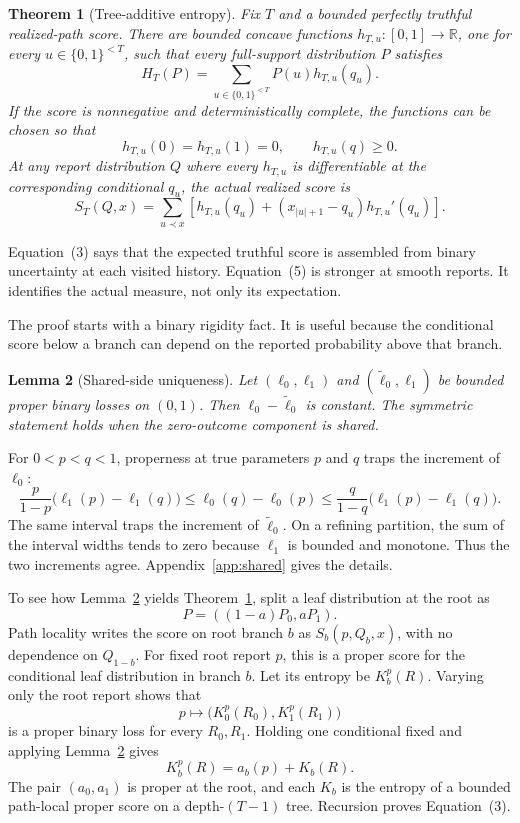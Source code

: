 \documentclass{article}
\newtheorem{theorem}{Theorem}
\newtheorem{lemma}[theorem]{Lemma}
\theoremstyle{definition}
\theoremstyle{remark}
\newcommand{\1}{\mathbf 1}
\begin{document}
\begin{theorem}[Tree-additive entropy]\label{thm:factorization}
Fix \(T\) and a bounded perfectly truthful realized-path score. There are bounded concave functions \(h_{T,u}:[0,1]\to\mathbb R\), one for every \(u\in\{0,1\}^{<T}\), such that every full-support distribution \(P\) satisfies \[ H_T(P)=\sum_{u\in\{0,1\}^{<T}}P(u)h_{T,u}(q_u). \tag{3} \] If the score is nonnegative and deterministically complete, the functions can be chosen so that \[ h_{T,u}(0)=h_{T,u}(1)=0,\qquad h_{T,u}(q)\ge0. \tag{4} \] At any report distribution \(Q\) where every \(h_{T,u}\) is differentiable at the corresponding conditional \(q_u\), the actual realized score is \[ S_T(Q,x)=\sum_{u\prec x}\left[h_{T,u}(q_u)+(x_{|u|+1}-q_u)h_{T,u}'(q_u)\right]. \tag{5} \]
\end{theorem}

Equation~(3) says that the expected truthful score is assembled from binary uncertainty at each visited history. Equation~(5) is stronger at smooth reports. It identifies the actual measure, not only its expectation.

The proof starts with a binary rigidity fact. It is useful because the conditional score below a branch can depend on the reported probability above that branch.

\begin{lemma}[Shared-side uniqueness]\label{lem:shared}
Let \((\ell_0,\ell_1)\) and \((\widetilde\ell_0,\ell_1)\) be bounded proper binary losses on \((0,1)\). Then \(\ell_0-\widetilde\ell_0\) is constant. The symmetric statement holds when the zero-outcome component is shared.
\end{lemma}

For \(0<p<q<1\), properness at true parameters \(p\) and \(q\) traps the increment of \(\ell_0\): \[ \frac{p}{1-p}\bigl(\ell_1(p)-\ell_1(q)\bigr) \le \ell_0(q)-\ell_0(p) \le \frac{q}{1-q}\bigl(\ell_1(p)-\ell_1(q)\bigr). \tag{6} \] The same interval traps the increment of \(\widetilde\ell_0\). On a refining partition, the sum of the interval widths tends to zero because \(\ell_1\) is bounded and monotone. Thus the two increments agree. Appendix~\ref{app:shared} gives the details.

To see how Lemma~\ref{lem:shared} yields Theorem~\ref{thm:factorization}, split a leaf distribution at the root as \[ P=((1-a)P_0,aP_1). \] Path locality writes the score on root branch \(b\) as \(S_b(p,Q_b,x)\), with no dependence on \(Q_{1-b}\). For fixed root report \(p\), this is a proper score for the conditional leaf distribution in branch \(b\). Let its entropy be \(K_b^p(R)\). Varying only the root report shows that \[ p\mapsto\bigl(K_0^p(R_0),K_1^p(R_1)\bigr) \] is a proper binary loss for every \(R_0,R_1\). Holding one conditional fixed and applying Lemma~\ref{lem:shared} gives \[ K_b^p(R)=a_b(p)+K_b(R). \tag{7} \] The pair \((a_0,a_1)\) is proper at the root, and each \(K_b\) is the entropy of a bounded path-local proper score on a depth-\((T-1)\) tree. Recursion proves Equation~(3).
\end{document}
